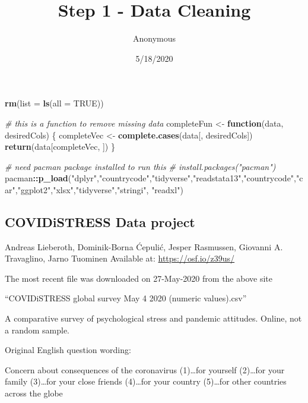 \documentclass[
]{article}
\title{Step 1 - Data Cleaning}
\author{Anonymous}
\date{5/18/2020}
\newenvironment{Shaded}{\begin{snugshade}}{\end{snugshade}}
\newcommand{\CommentTok}[1]{\textcolor[rgb]{0.56,0.35,0.01}{\textit{#1}}}
\newcommand{\ControlFlowTok}[1]{\textcolor[rgb]{0.13,0.29,0.53}{\textbf{#1}}}
\newcommand{\DataTypeTok}[1]{\textcolor[rgb]{0.13,0.29,0.53}{#1}}
\newcommand{\KeywordTok}[1]{\textcolor[rgb]{0.13,0.29,0.53}{\textbf{#1}}}
\newcommand{\NormalTok}[1]{#1}
\newcommand{\OperatorTok}[1]{\textcolor[rgb]{0.81,0.36,0.00}{\textbf{#1}}}
\newcommand{\OtherTok}[1]{\textcolor[rgb]{0.56,0.35,0.01}{#1}}
\newcommand{\StringTok}[1]{\textcolor[rgb]{0.31,0.60,0.02}{#1}}
\begin{document}
\maketitle

\begin{Shaded}
\begin{Highlighting}[]
\KeywordTok{rm}\NormalTok{(}\DataTypeTok{list =} \KeywordTok{ls}\NormalTok{(}\DataTypeTok{all =} \OtherTok{TRUE}\NormalTok{))}

\CommentTok{# this is a function to remove missing data}
\NormalTok{completeFun <-}\StringTok{ }\ControlFlowTok{function}\NormalTok{(data, desiredCols) \{}
\NormalTok{  completeVec <-}\StringTok{ }\KeywordTok{complete.cases}\NormalTok{(data[, desiredCols])}
  \KeywordTok{return}\NormalTok{(data[completeVec, ])}
\NormalTok{\}}

\CommentTok{# need pacman package installed to run this}
\CommentTok{# install.packages("pacman")}
\NormalTok{pacman}\OperatorTok{::}\KeywordTok{p_load}\NormalTok{(}\StringTok{"dplyr"}\NormalTok{,}\StringTok{"countrycode"}\NormalTok{,}\StringTok{"tidyverse"}\NormalTok{,}\StringTok{"readstata13"}\NormalTok{,}\StringTok{"countrycode"}\NormalTok{,}\StringTok{"car"}\NormalTok{,}\StringTok{"ggplot2"}\NormalTok{,}\StringTok{"xlsx"}\NormalTok{,}\StringTok{"tidyverse"}\NormalTok{,}\StringTok{"stringi"}\NormalTok{, }\StringTok{"readxl"}\NormalTok{)}
\end{Highlighting}
\end{Shaded}

\hypertarget{covidistress-data-project}{%
\subsection{COVIDiSTRESS Data project}\label{covidistress-data-project}}

Andreas Lieberoth, Dominik-Borna Ćepulić, Jesper Rasmussen, Giovanni A.
Travaglino, Jarno Tuominen Available at: \url{https://osf.io/z39us/}

The most recent file was downloaded on 27-May-2020 from the above site

``COVIDiSTRESS global survey May 4 2020 (numeric values).csv''

A comparative survey of psychological stress and pandemic attitudes.
Online, not a random sample.

Original English question wording:

Concern about consequences of the coronavirus (1)\ldots for yourself
(2)\ldots for your family (3)\ldots for your close friends (4)\ldots for
your country (5)\ldots for other countries across the globe
\end{document}
